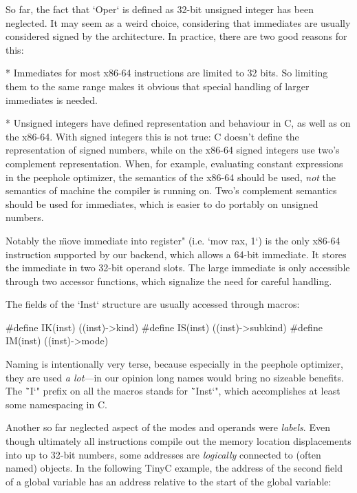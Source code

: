 So far, the fact that `Oper` is defined as 32-bit unsigned integer has been
neglected. It may seem as a weird choice, considering that immediates
are usually considered signed by the architecture. In practice, there are two
good reasons for this:



\begitems
* Immediates for most x86-64 instructions are limited to 32 bits. So limiting
them to the same range makes it obvious that special handling of larger
immediates is needed.

* Unsigned integers have defined representation and behaviour in C, as well as
on the x86-64. With signed integers this is not true: C doesn't define the
representation of signed numbers, while on the x86-64 signed integers use {two's complement}
representation. When, for example, evaluating constant expressions in the peephole
optimizer, the semantics of the x86-64 should be used, {\em not} the semantics
of machine the compiler is running on. Two's complement semantics should be used
for immediates, which is easier to do portably on unsigned numbers.
\enditems

Notably the \"move immediate into register" (i.e. `mov rax, 1`) is the only x86-64 instruction
supported by our backend, which allows a 64-bit immediate. It stores the immediate
in two 32-bit operand slots. The large immediate is only accessible through two
accessor functions, which signalize the need for careful handling.

The fields of the `Inst` structure are usually accessed through macros:

\begtt
#define IK(inst) ((inst)->kind)
#define IS(inst) ((inst)->subkind)
#define IM(inst) ((inst)->mode)
\endtt

Naming is intentionally very terse, because especially in the peephole
optimizer, they are used {\em a
lot}---in our opinion long names would bring no sizeable benefits. The \"`I`"
prefix on all the macros stands for \"`Inst`", which accomplishes at least some
namespacing in C.

Another so far neglected aspect of the modes and operands were {\em labels}.
Even though ultimately all instructions compile out the memory location
displacements into up to 32-bit numbers, some addresses are {\em logically}
connected to (often named) objects. In the following TinyC example, the address of the
second field of a global variable has an address relative to the start of the
global variable:

